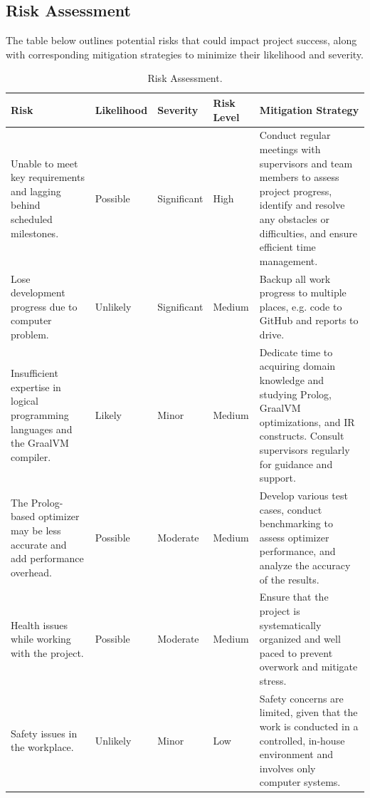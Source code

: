 \subsection{Risk Assessment}
The table below outlines potential risks that could impact project success, along with corresponding mitigation strategies to minimize their likelihood and severity.
\renewcommand{\arraystretch}{1.3}
\begin{table}[h]
    \begin{tabularx}{1\textwidth} { 
        | >{\raggedright\arraybackslash}p{8em}
        | >{\raggedright\arraybackslash}p{4.5em} 
        | >{\raggedright\arraybackslash}p{4.5em} 
        | >{\raggedright\arraybackslash}p{3.5em} 
        | >{\raggedright\arraybackslash}X 
        | 
        }   
        \hline
        \textbf{Risk} & 
        \textbf{Likelihood} & 
        \textbf{Severity} & 
        \textbf{Risk Level} &
        \textbf{Mitigation Strategy}
        \\ 
        \hline
        Unable to meet key requirements and lagging behind scheduled milestones.
        & Possible & Significant & High & 
        Conduct regular meetings with supervisors and team members to assess project progress, identify and resolve any obstacles or difficulties, and ensure efficient time management.
        \\ 
        \hline
        Lose development progress due to computer problem.
        & Unlikely & Significant & Medium & 
        Backup all work progress to multiple places, e.g. code to GitHub and reports to drive.
        \\ 
        \hline
        Insufficient expertise in logical programming languages and the GraalVM compiler.
        & Likely & Minor & Medium &
        Dedicate time to acquiring domain knowledge and studying Prolog, GraalVM optimizations, and IR constructs. Consult supervisors regularly for guidance and support.
        \\ 
        \hline
        The Prolog-based optimizer may be less accurate and add performance overhead.
        & Possible & Moderate & Medium &
        Develop various test cases, conduct benchmarking to assess optimizer performance, and analyze the accuracy of the results.
        \\ 
        \hline
        Health issues while working with the project.
        & Possible & Moderate & Medium &
        Ensure that the project is systematically organized and well paced to prevent overwork and mitigate stress.
        \\ 
        \hline
        Safety issues in the workplace.
        & Unlikely & Minor & Low &
        Safety concerns are limited, given that the work is conducted in a controlled, in-house environment and involves only computer systems.
        \\ 
        \hline
    \end{tabularx}
\caption{Risk Assessment.}
\end{table}

